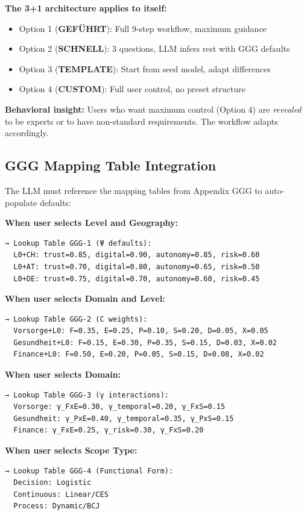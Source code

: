 \begin{tcolorbox}[colback=cyan!5!white, colframe=cyan!75!black,
    title=Step 0: Recursive 3+1 for Workflow Selection]
\textbf{The 3+1 architecture applies to itself:}
\begin{itemize}[nosep]
\item Option 1 (\textbf{GEFÜHRT}): Full 9-step workflow, maximum guidance
\item Option 2 (\textbf{SCHNELL}): 3 questions, LLM infers rest with GGG defaults
\item Option 3 (\textbf{TEMPLATE}): Start from seed model, adapt differences
\item Option 4 (\textbf{CUSTOM}): Full user control, no preset structure
\end{itemize}

\textbf{Behavioral insight:} Users who want maximum control (Option 4) are
\textit{revealed} to be experts or to have non-standard requirements. The
workflow adapts accordingly.
\end{tcolorbox}

\subsection{GGG Mapping Table Integration}

The LLM must reference the mapping tables from Appendix GGG to auto-populate defaults:

\begin{tcolorbox}[colback=white, colframe=black,
    title=GGG Mapping Reference for LLM]
\small
\textbf{When user selects Level and Geography:}
\begin{verbatim}
→ Lookup Table GGG-1 (Ψ defaults):
  L0+CH: trust=0.85, digital=0.90, autonomy=0.85, risk=0.60
  L0+AT: trust=0.70, digital=0.80, autonomy=0.65, risk=0.50
  L0+DE: trust=0.75, digital=0.70, autonomy=0.60, risk=0.45
\end{verbatim}

\textbf{When user selects Domain and Level:}
\begin{verbatim}
→ Lookup Table GGG-2 (C weights):
  Vorsorge+L0: F=0.35, E=0.25, P=0.10, S=0.20, D=0.05, X=0.05
  Gesundheit+L0: F=0.15, E=0.30, P=0.35, S=0.15, D=0.03, X=0.02
  Finance+L0: F=0.50, E=0.20, P=0.05, S=0.15, D=0.08, X=0.02
\end{verbatim}

\textbf{When user selects Domain:}
\begin{verbatim}
→ Lookup Table GGG-3 (γ interactions):
  Vorsorge: γ_FxE=0.30, γ_temporal=0.20, γ_FxS=0.15
  Gesundheit: γ_PxE=0.40, γ_temporal=0.35, γ_PxS=0.15
  Finance: γ_FxE=0.25, γ_risk=0.30, γ_FxS=0.20
\end{verbatim}

\textbf{When user selects Scope Type:}
\begin{verbatim}
→ Lookup Table GGG-4 (Functional Form):
  Decision: Logistic
  Continuous: Linear/CES
  Process: Dynamic/BCJ
\end{verbatim}
\end{tcolorbox}

